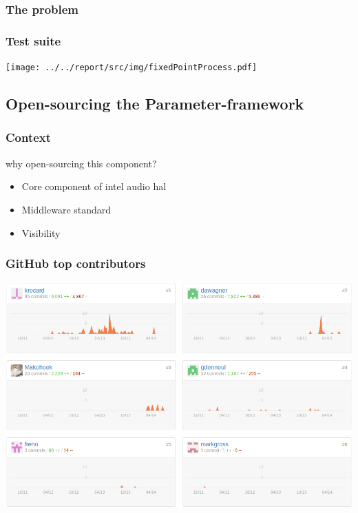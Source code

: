\begin{frame}
    \frametitle{The problem}
    
\end{frame}

\begin{frame}
    \frametitle{Test suite}
    \texttt{[image: ../../report/src/img/fixedPointProcess.pdf]}
\end{frame}

\subsection{Open-sourcing the Parameter-framework}
\subsubsection{Context}
\begin{FrameWithSubSection}
    \begin{block}{why open-sourcing this component?}
        \begin{itemize}
            \item Core component of intel audio hal
            \item Middleware standard
            \item Visibility
        \end{itemize}
    \end{block}
\end{FrameWithSubSection}

\begin{frame}
    \frametitle{GitHub top contributors}
    \centering
    \includegraphics[width=\textwidth]{../../report/src/img/statsGitHub.png}
\end{frame}

